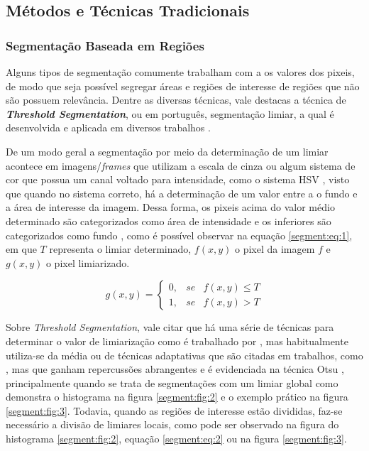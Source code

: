 \subsection{Métodos e Técnicas Tradicionais}
\label{segment:segment}
\subsubsection{Segmentação Baseada em Regiões}
\label{segment:region}

Alguns tipos de segmentação comumente trabalham com a os valores dos pixeis, de modo que seja possível segregar áreas e regiões de interesse de regiões que não são possuem relevância. Dentre as diversas técnicas, vale destacas a técnica de \textbf{\textit{Threshold Segmentation}}, ou em português, segmentação limiar, a qual é desenvolvida e aplicada em diversos trabalhos \cite{Yanowitz1989}.

De um modo geral a segmentação por meio da determinação de um limiar acontece em imagens/\textit{frames} que utilizam a escala de cinza ou algum sistema de cor que possua um canal voltado para intensidade, como o sistema HSV \cite{schneider2003experimentos}, visto que quando no sistema correto, há a determinação de um valor entre a o fundo e a área de interesse da imagem. Dessa forma, os pixeis acima do valor médio determinado são categorizados como área de intensidade e os inferiores são categorizados como fundo \cite{pedrini2008analise}, como é possível observar na equação \ref{segment:eq:1}, em que $T$ representa o limiar determinado, $f(x,y)$ o pixel da imagem $f$ e $g(x,y)$ o pixel limiarizado.

\begin{equation}
\label{segment:eq:1}
    g(x,y) = \left\{\begin{matrix}
        0, & se & f(x,y) \leq T\\ 
        1, & se & f(x,y) > T
    \end{matrix}\right.
\end{equation}

Sobre \textit{Threshold Segmentation}, vale citar que há uma série de técnicas para determinar o valor de limiarização como é trabalhado por \cite{Al-amri2010ImageTechniques}, mas habitualmente utiliza-se da média \cite{Al-amri2010ImageTechniques, Yanowitz1989, Yuheng2017ImageOverview} ou de técnicas adaptativas que são citadas em trabalhos, como \cite{Yanowitz1989}, mas que ganham repercussões abrangentes e é evidenciada na técnica Otsu \cite{Otsu1979THRESHOLDHISTOGRAMS.}, principalmente quando se trata de segmentações com um limiar global como demonstra o histograma na figura \ref{segment:fig:2} e o exemplo prático na figura  \ref{segment:fig:3}. Todavia, quando as regiões de interesse estão divididas, faz-se necessário a divisão de limiares locais, como pode ser observado na figura do histograma \ref{segment:fig:2}, equação \ref{segment:eq:2} ou na figura \ref{segment:fig:3}.

